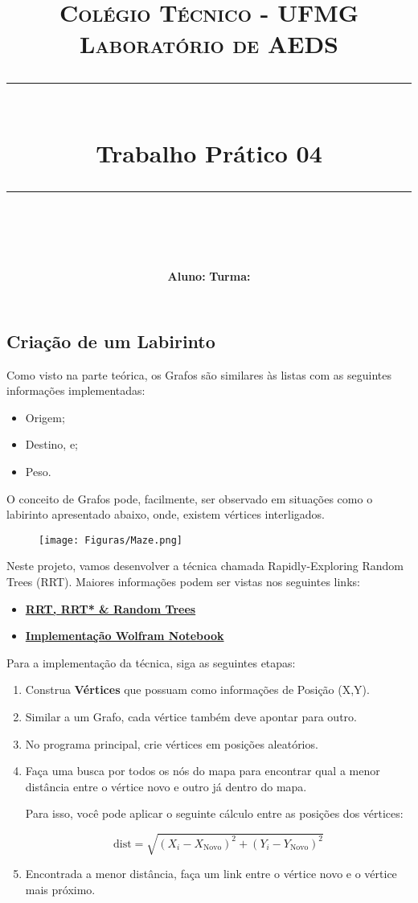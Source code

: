 \documentclass[a4paper]{exam}
\title{
	\normalfont \normalsize 
	\textsc{Colégio Técnico - UFMG \\ 
		Laboratório de AEDS} \\
	\rule{\linewidth}{0.5pt} \\
	\huge Trabalho Prático 04 \\
	\rule{\linewidth}{2pt} \\
}
\author{\textbf{Aluno:} \hspace{10cm} \textbf{Turma:}}
\date{}
\begin{document}
\maketitle

\begin{center}
	\section*{Criação de um Labirinto}
\end{center}

Como visto na parte teórica, os Grafos são similares às listas com as seguintes informações implementadas:
\begin{itemize}
	\item Origem;
	\item Destino, e;
	\item Peso.
\end{itemize}

O conceito de Grafos pode, facilmente, ser observado em situações como o labirinto apresentado abaixo, onde, existem vértices interligados.
\begin{figure}[H]
	\centering
	\texttt{[image: Figuras/Maze.png]}
\end{figure}

Neste projeto, vamos desenvolver a técnica chamada Rapidly-Exploring Random Trees (RRT). Maiores informações podem ser vistas nos seguintes links:
\begin{itemize}
	\item \href{https://www.youtube.com/watch?v=Ob3BIJkQJEw}{\textbf{RRT, RRT* \& Random Trees}}
	\item \href{https://www.wolframcloud.com/objects/demonstrations/RapidlyExploringRandomTreeRRTAndRRT-source.nb}{\textbf{Implementação Wolfram Notebook}}
\end{itemize}

Para a implementação da técnica, siga as seguintes etapas:

\begin{enumerate}
	\item Construa \textbf{Vértices} que possuam como informações de Posição (X,Y).
	
	\item Similar a um Grafo, cada vértice também deve apontar para outro.
	
	\item No programa principal, crie vértices em posições aleatórios.
	
	\item Faça uma busca por todos os nós do mapa para encontrar qual a menor distância entre o vértice novo e outro já dentro do mapa.
	
	Para isso, você pode aplicar o seguinte cálculo entre as posições dos vértices:
	
	$$ \text{dist}= \sqrt{(X_i -X_\text{Novo})^2 + (Y_i -Y_\text{Novo})^2} $$
	
	\item Encontrada a menor distância, faça um link entre o vértice novo e o vértice mais próximo.
\end{enumerate}

\end{document}
